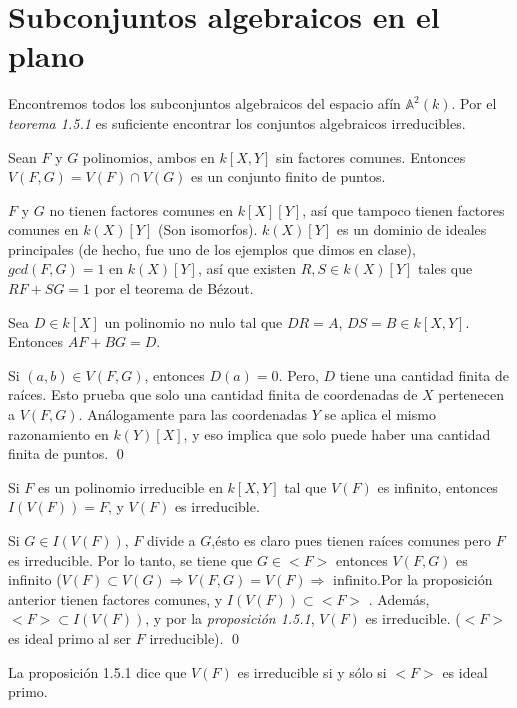 \section{Subconjuntos algebraicos en el plano}

Encontremos todos los subconjuntos algebraicos del espacio afín $\mathbb{A}^2(k)$. Por el \textit{teorema 1.5.1} es suficiente encontrar los conjuntos algebraicos irreducibles.

\begin{Prop}
Sean $F$ y $G$ polinomios, ambos en $k[X,Y]$ sin factores comunes. Entonces $V(F,G)=V(F)\cap V(G)$ es un conjunto finito de puntos.
\end{Prop}

\begin{Dem}
  $F$ y $G$ no tienen factores comunes en $k[X][Y]$, así que tampoco tienen factores comunes en $k(X)[Y]$ (Son isomorfos). $k(X)[Y]$ es un dominio de ideales principales (de hecho, fue uno de los ejemplos que dimos en clase), $gcd(F,G)=1$ en $k(X)[Y]$, así que existen $R,S\in k(X)[Y]$ tales que $RF+SG=1$ por el teorema de Bézout. 

  Sea $D\in k[X]$ un polinomio no nulo tal que $DR=A$, $DS=B\in k[X,Y]$. Entonces $AF+BG=D$.

  Si $(a,b)\in V(F,G)$, entonces $D(a)=0$. Pero, $D$ tiene una cantidad finita de raíces. Esto prueba que solo una cantidad finita de coordenadas de $X$ pertenecen a $V(F,G)$.  Análogamente para las coordenadas $Y$ se aplica el mismo razonamiento en $k(Y)[X]$, y eso implica que solo puede haber una cantidad finita de puntos. \qed

\end{Dem}

\begin{Cor}
Si $F$ es un polinomio irreducible en $k[X,Y]$ tal que $V(F)$ es infinito, entonces $I(V(F))=F$, y $V(F)$ es irreducible.
\end{Cor}

\begin{Dem}
  Si $G\in I(V(F))$, $F$ divide a $G$,ésto es claro pues tienen raíces comunes pero $F$ es irreducible. Por lo tanto, se tiene que $G\in <F>$ entonces $V(F,G)$ es infinito ($V(F)\subset V(G) \Rightarrow V(F,G)=V(F)\Rightarrow \text{ infinito}$.Por la proposición anterior  tienen factores comunes, y $I(V(F))\subset <F>$ . Además, $<F> \subset I(V(F))$, y por la \textit{proposición 1.5.1}, $V(F)$ es irreducible. ($<F>$ es ideal primo al ser $F$ irreducible). \qed
\end{Dem}
\begin{nota}
La proposición 1.5.1 dice que $V(F)$ es irreducible si y sólo si $<F>$ es ideal primo.
\end{nota}

